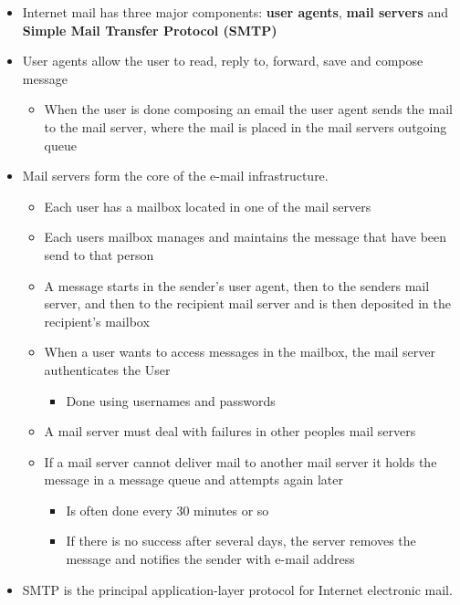 \documentclass[11pt]{article}
\providecommand{\tightlist}{%
      \setlength{\itemsep}{0pt}\setlength{\parskip}{0pt}}
\begin{document}
\begin{itemize}
\tightlist
\item
  Internet mail has three major components: \textbf{user agents},
  \textbf{mail servers} and \textbf{Simple Mail Transfer Protocol
  (SMTP)}
\item
  User agents allow the user to read, reply to, forward, save and
  compose message

  \begin{itemize}
  \tightlist
  \item
    When the user is done composing an email the user agent sends the
    mail to the mail server, where the mail is placed in the mail
    servers outgoing queue
  \end{itemize}
\item
  Mail servers form the core of the e-mail infrastructure.

  \begin{itemize}
  \tightlist
  \item
    Each user has a mailbox located in one of the mail servers
  \item
    Each users mailbox manages and maintains the message that have been
    send to that person
  \item
    A message starts in the sender's user agent, then to the senders
    mail server, and then to the recipient mail server and is then
    deposited in the recipient's mailbox
  \item
    When a user wants to access messages in the mailbox, the mail server
    authenticates the User

    \begin{itemize}
    \tightlist
    \item
      Done using usernames and passwords
    \end{itemize}
  \item
    A mail server must deal with failures in other peoples mail servers
  \item
    If a mail server cannot deliver mail to another mail server it holds
    the message in a message queue and attempts again later

    \begin{itemize}
    \tightlist
    \item
      Is often done every 30 minutes or so
    \item
      If there is no success after several days, the server removes the
      message and notifies the sender with e-mail address
    \end{itemize}
  \end{itemize}
\item
  SMTP is the principal application-layer protocol for Internet
  electronic mail.


\end{itemize}
\end{document}
